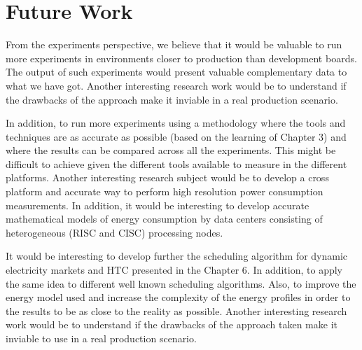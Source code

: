 \chapter{Future Work}

From the experiments perspective, we believe that it would be valuable to run more experiments in environments closer to production than development boards. The output of such experiments would present valuable complementary data to what we have got. Another interesting research work would be to understand if the drawbacks of the approach make it inviable in a real production scenario.


In addition, to run more experiments using a methodology where the tools and techniques are as accurate as possible (based on the learning of Chapter 3) and where the results can be compared across all the experiments. This might be difficult to achieve given the different tools available to measure in the different platforms. Another interesting research subject would be to develop a cross platform and accurate way to perform high resolution power consumption measurements. In addition, it would be interesting to develop accurate mathematical models of energy consumption by data centers consisting of heterogeneous (RISC and CISC) processing nodes.


It would be interesting to develop further the scheduling algorithm for dynamic electricity markets and HTC presented in the Chapter 6. In addition, to apply the same idea to different well known scheduling algorithms. Also, to improve the energy model used and increase the complexity of the energy profiles in order to the results to be as close to the reality as possible. Another interesting research work would be to understand if the drawbacks of the approach taken make it inviable to use in a real production scenario.


